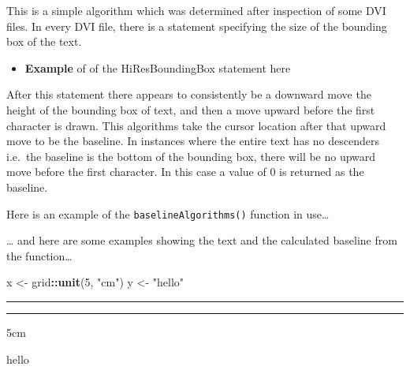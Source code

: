 \documentclass[]{article}
\newenvironment{Shaded}{\begin{snugshade}}{\end{snugshade}}
\newcommand{\KeywordTok}[1]{\textcolor[rgb]{0.13,0.29,0.53}{\textbf{#1}}}
\newcommand{\DecValTok}[1]{\textcolor[rgb]{0.00,0.00,0.81}{#1}}
\newcommand{\StringTok}[1]{\textcolor[rgb]{0.31,0.60,0.02}{#1}}
\newcommand{\OperatorTok}[1]{\textcolor[rgb]{0.81,0.36,0.00}{\textbf{#1}}}
\newcommand{\NormalTok}[1]{#1}
\providecommand{\tightlist}{%
  \setlength{\itemsep}{0pt}\setlength{\parskip}{0pt}}
\begin{document}
This is a simple algorithm which was determined after inspection of some
DVI files. In every DVI file, there is a statement specifying the size
of the bounding box of the text.

\begin{itemize}
\tightlist
\item
  \textbf{Example} of of the HiResBoundingBox statement here
\end{itemize}

After this statement there appears to consistently be a downward move
the height of the bounding box of text, and then a move upward before
the first character is drawn. This algorithms take the cursor location
after that upward move to be the baseline. In instances where the entire
text has no descenders i.e.~the baseline is the bottom of the bounding
box, there will be no upward move before the first character. In this
case a value of 0 is returned as the baseline.

Here is an example of the \texttt{baselineAlgorithms()} function in
use\ldots{}

\ldots{} and here are some examples showing the text and the calculated
baseline from the function\ldots{}

\begin{Shaded}
\begin{Highlighting}[]
\NormalTok{x <-}\StringTok{ }\NormalTok{grid}\OperatorTok{::}\KeywordTok{unit}\NormalTok{(}\DecValTok{5}\NormalTok{, }\StringTok{"cm"}\NormalTok{)}
\NormalTok{y <-}\StringTok{ "hello"}
\end{Highlighting}
\end{Shaded}

\newsavebox{\dvibox}

\newcommand{\boxreport}[2]{%
  \sbox{\dvibox}{\parbox[b]{1in}{#1}}%
  \usebox{\dvibox}%
  \vspace{-#2}%
  \hrule%
  \vspace{#2}%
}

\boxreport{testing}{0cm}

\boxreport{testing}{0.5mm}

\newcommand\rText{5cm}

\rText

\newcommand\sText{hello}

\sText
\end{document}
